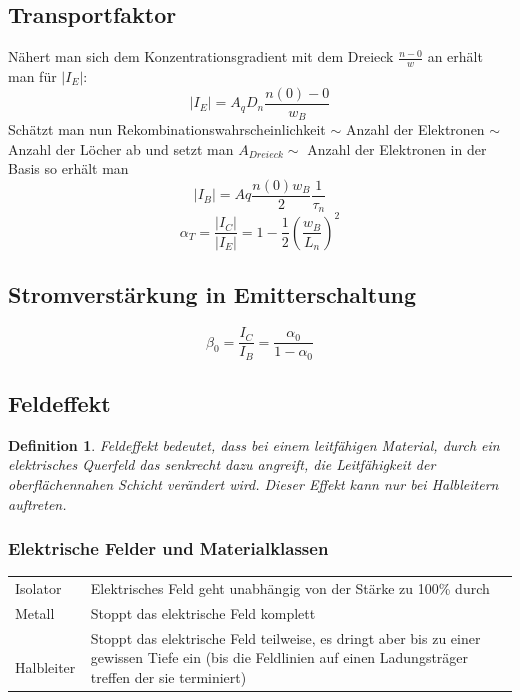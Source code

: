 \documentclass[12pt,a4paper]{report}%
\newtheorem{definition}[satz]{Definition}
\numberwithin{equation}{section}
\numberwithin{equation}{subsection}
\begin{document}
   \subsection{Transportfaktor}
   Nähert man sich dem Konzentrationsgradient mit dem Dreieck $\frac{n-0}{w}$ an erhält man für $|I_E|$:
   \begin{equation}
     |I_E| = A_q D_n \frac{n(0)-0}{w_B}
   \end{equation}
   Schätzt man nun Rekombinationswahrscheinlichkeit $\sim$ Anzahl der Elektronen $\sim$ Anzahl der Löcher ab und setzt man $A_{Dreieck} \sim$ Anzahl der Elektronen in der Basis so erhält man
   \begin{equation}
     |I_B| = Aq \frac{n(0)w_B}{2}\frac{1}{\tau_n}
   \end{equation}
   \begin{equation}
     \alpha_T = \frac{|I_C|}{|I_E|} = 1 - \frac{1}{2}\left(\frac{w_B}{L_n}\right)^2
   \end{equation}
   
   \subsection{Stromverstärkung in Emitterschaltung}
   \begin{equation}
     \beta_0 = \frac{I_C}{I_B} = \frac{\alpha_0}{1-\alpha_0}
   \end{equation}
   \subsection{Feldeffekt}
   \begin{definition}
     Feldeffekt bedeutet, dass bei einem leitfähigen Material, durch ein elektrisches Querfeld das senkrecht dazu angreift, die Leitfähigkeit der oberflächennahen Schicht verändert wird. Dieser Effekt kann nur bei Halbleitern auftreten.
   \end{definition}
     \subsubsection{Elektrische Felder und Materialklassen}
     \begin{table}[H]
       \centering
       \begin{tabular}{P{3cm} | p{9cm}}
         Isolator & Elektrisches Feld geht unabhängig von der Stärke zu 100\% durch \\
         Metall & Stoppt das elektrische Feld komplett \\
         $\;$\newline Halbleiter & Stoppt das elektrische Feld teilweise, es dringt aber bis zu einer gewissen Tiefe ein (bis die Feldlinien auf einen Ladungsträger treffen der sie terminiert)
       \end{tabular}
     \end{table}
\end{document}
